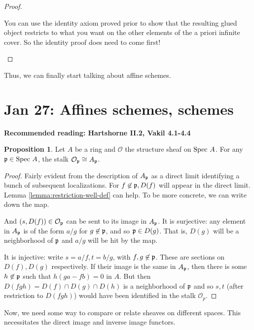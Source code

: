 \documentclass[10pt,reqno]{amsart}
\theoremstyle{definition}
\newtheorem{proposition}[theorem]{Proposition}
\theoremstyle{remark}
\numberwithin{equation}{section}
\numberwithin{theorem}{section}
\newcommand{\OO}{{\mathcal O}}
\newcommand{\spec}{\textup{Spec }}
\newcommand{\pp}{\frak{p}}
\begin{document}
\begin{proof}
\begin{itemize}
 You can use the identity axiom proved prior to show that the resulting glued object restricts to what you want on the other elements of the a priori infinite cover. So the identity proof does need to come first!
 \end{itemize}
 \end{proof}
 Thus, we can finally start talking about affine schemes.
\section{Jan 27: Affines schemes, schemes}
\textbf{Recommended reading: Hartshorne II.2, Vakil 4.1-4.4}

\begin{proposition} Let $A$ be a ring and $\OO$ the structure sheaf on $\spec A$. For any $\pp \in \spec A$, the stalk $\OO_{\pp} \cong A_{\pp}$.
\end{proposition}
\begin{proof}
Fairly evident from the description of $A_{\pp}$ as  a direct limit identifying a bunch of subsequent localizations. For $f \not \in \pp, D(f)$ will appear in the direct limit. Lemma \ref{lemma:restriction-well-def}  can help. To be more concrete, we can write down the map.

And $(s,D(f)) \in \OO_{\pp}$ can be sent to its image in $A_{\pp}$. It is surjective: any element in $A_{\pp}$ is of the form $a/g$ for $g \not \in \pp$, and so $\pp \in D(g)$. That is, $D(g)$ will be a neighborhood of $\pp$ and $a/g$ will be hit by the map.

It is injective: write $s = a/f, t = b/g$, with $f,g \not \in \pp$. These are sections on $D(f), D(g)$ respectively. If their image is the same in $A_{\pp}$, then there is some $h \not \in \pp$ such that $h(ga-fb) = 0$ in $A$. But then $D(fgh) = D(f) \cap D(g) \cap D(h)$ is a neighborhood of $\pp$ and so $s,t$ (after restriction to $D(fgh)$) would have been identified in the stalk $\OO_p$.
\end{proof}

Now, we need some way to compare or relate sheaves on different spaces. This necessitates the direct image and inverse image functors.
\end{document}
